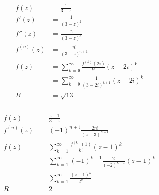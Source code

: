 \documentclass{article}
\begin{document}
\begin{align*}
  f(z)       & = \frac{1}{3 - z}                                             \\
  f'(z)      & = \frac{1}{(3 - z)^2}                                         \\
  f''(z)     & = \frac{2}{(3 - z)^3}                                         \\
  f^{(n)}(z) & = \frac{n!}{(3 - z)^{n + 1}}                                  \\
  f(z)       & = \sum_{k = 0}^\infty \frac{f^{(k)} (2 i)}{k!} (z - 2 i)^k    \\
             & = \sum_{k = 0}^\infty \frac{1}{(3 - 2 i)^{k + 1}} (z - 2 i)^k \\
  R          & = \sqrt{13}
\end{align*}

\setcounter{subsubsection}{16}
\subsubsection{}

\begin{align*}
  f(z)       & = \frac{z - 1}{3 - z}                                               \\
  f^{(n)}(z) & = (-1)^{n + 1} \frac{2 n!}{(z - 3)^{n + 1}}                         \\
  f(z)       & = \sum_{k = 1}^\infty \frac{f^{(k)} (1)}{k!} (z - 1)^k              \\
             & = \sum_{k = 1}^\infty (-1)^{k + 1} \frac{2}{(-2)^{k + 1}} (z - 1)^k \\
             & = \sum_{k = 1}^\infty \frac{(z - 1)^k}{2^k}                         \\
  R          & = 2
\end{align*}

\setcounter{subsubsection}{18}
\subsubsection{}
\end{document}
